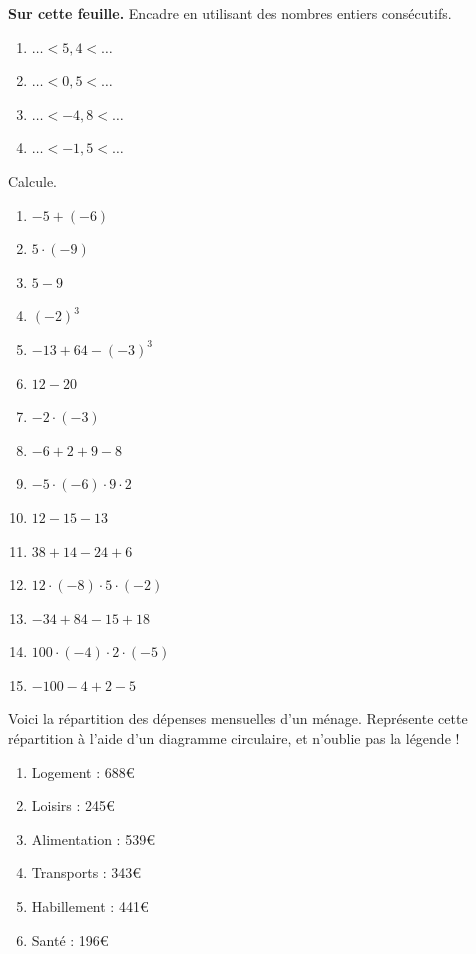 \documentclass[12pt,parskip=half-, twoside=semi]{scrartcl}
\begin{document}
\begin{exercise}
    \textbf{Sur cette feuille.} Encadre en utilisant des nombres entiers consécutifs.
    \begin{enumerate}[cols=2, label=]
        \item $\ldots < 5,4 < \dots$
        \item $\ldots < 0,5 < \dots$
        \item $\ldots < -4,8 < \dots$
        \item $\ldots < -1,5 < \dots$
    \end{enumerate}
  \end{exercise}
  
  \begin{exercise}
      Calcule.
      \begin{enumerate}[cols=3]
          \item $-5 + (-6) $
          \item $5 \cdot (-9) $
          \item $5 - 9 $
          \item $(-2)^3 $
          \item $-13 + 64 - (-3)^3 $
          \item $12 - 20 $
          \item $-2\cdot (-3) $
          \item $-6 + 2 + 9 - 8$
          \item $-5\cdot (-6) \cdot 9 \cdot 2 $
          \item $12 - 15 - 13 $
          \item $38 + 14 - 24 + 6 $
          \item $12\cdot (-8) \cdot 5\cdot (-2) $
          \item $-34 + 84 - 15 + 18 $
          \item $100 \cdot (-4) \cdot 2 \cdot (-5) $
          \item $-100 - 4 + 2 - 5 $
      \end{enumerate}
  \end{exercise}

\begin{exercise}
    Voici la répartition des dépenses mensuelles d'un ménage. Représente cette répartition à l'aide d'un diagramme circulaire, et n'oublie pas la légende ! 
    \begin{enumerate}[cols=3, label=]
        \item Logement : 688€
        \item Loisirs : 245€
        \item Alimentation : 539€
        \item Transports : 343€
        \item Habillement : 441€
        \item Santé : 196€
    \end{enumerate}
\end{exercise}
\end{document}

